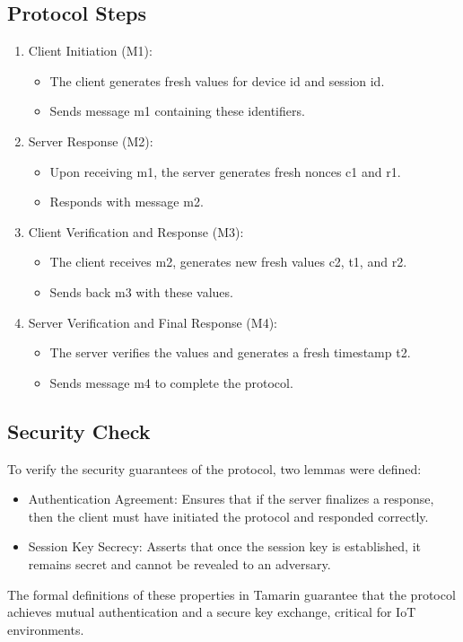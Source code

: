 \subsection{Protocol Steps}
\begin{enumerate}
    \item Client Initiation (M1): 
            \begin{itemize}
                \item The client generates fresh values for device id and session id.
                \item Sends message m1 containing these identifiers.
            \end{itemize}
    \item Server Response (M2):
            \begin{itemize}
                \item Upon receiving m1, the server generates fresh nonces c1 and r1.
                \item Responds with message m2.
            \end{itemize}
   \item Client Verification and Response (M3):
            \begin{itemize}
                \item The client receives m2, generates new fresh values c2, t1, and r2.
                \item Sends back m3 with these values.
            \end{itemize}
    \item Server Verification and Final Response (M4):
            \begin{itemize}
                \item The server verifies the values and generates a fresh timestamp t2.
                \item Sends message m4 to complete the protocol.
            \end{itemize}
\end{enumerate}

\subsection{Security Check}
To verify the security guarantees of the protocol, two lemmas were defined:
\begin{itemize}
    \item Authentication Agreement: Ensures that if the server finalizes a response, then the client must have initiated the protocol and responded correctly.
    \item Session Key Secrecy: Asserts that once the session key is established, it remains secret and cannot be revealed to an adversary.
\end{itemize}
The formal definitions of these properties in Tamarin guarantee that the protocol achieves mutual authentication and a secure key exchange, critical for IoT environments.

